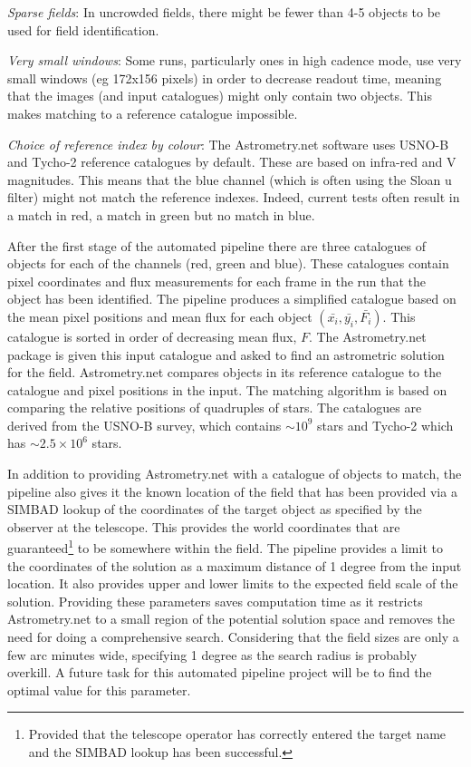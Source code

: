 \emph{Sparse fields}: In uncrowded fields, there might be fewer than 4-5 objects to be used for field identification. 

\emph{Very small windows}: Some runs, particularly ones in high cadence mode, use very small windows (eg 172x156 pixels) in order to decrease readout time, meaning that the images (and input catalogues) might only contain two objects. This makes matching to a reference catalogue impossible. 

\emph{Choice of reference index by colour}: The Astrometry.net software uses USNO-B and Tycho-2 reference catalogues by default. These are based on infra-red and V magnitudes. This means that the blue channel (which is often using the Sloan u filter) might not match the reference indexes. Indeed, current tests often result in a match in red, a match in green but no match in blue. 

After the first stage of the automated pipeline there are three catalogues of objects for each of the channels (red, green and blue). These catalogues contain pixel coordinates and flux measurements for each frame in the run that the object has been identified. The pipeline produces a simplified catalogue based on the mean pixel positions and mean flux for each object $(\bar{x_i}, \bar{y_i}, \bar{F_i})$. This catalogue is sorted in order of decreasing mean flux, $F$. The Astrometry.net package is given this input catalogue and asked to find an astrometric solution for the field.  Astrometry.net compares objects in its reference catalogue to the catalogue and pixel positions in the input. The matching algorithm is based on comparing the relative positions of quadruples of stars. The catalogues are derived from the USNO-B survey, which contains $\sim10^9$ stars and Tycho-2 which has $\sim2.5\times10^6$ stars. 

In addition to providing Astrometry.net with a catalogue of objects to match, the pipeline also gives it the known location of the field that has been provided via a SIMBAD lookup of the coordinates of the target object as specified by the observer at the telescope. This provides the world coordinates that are guaranteed\footnote{Provided that the telescope operator has correctly entered the target name and the SIMBAD lookup has been successful.} to be somewhere within the field. The pipeline provides a limit to the coordinates of the solution as a maximum distance of 1 degree from the input location. It also provides upper and lower limits to the expected field scale of the solution. Providing these parameters saves computation time as it restricts Astrometry.net to a small region of the potential solution space and removes the need for doing a comprehensive search. Considering that the field sizes are only a few arc minutes wide, specifying 1 degree as the search radius is probably overkill. A future task for this automated pipeline project will be to find the optimal value for this parameter.

